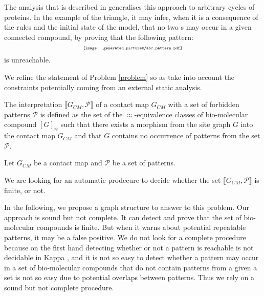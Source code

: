 \documentclass{entcs}
\newcommand{\graphsymb}{G}
\newcommand{\iso}{\approx}
\begin{document}
The analysis that is described in \cite{afp} generalises this approach to arbitrary cycles of proteins. In the example of the triangle, it may infer, when it is a consequence of the rules and the initial state of the model, that no two s may occur in a given connected compound, by proving that the following pattern:
\begin{equation*}
\scalebox{0.6}{\texttt{[image: generated\_pictures/abc\_pattern.pdf]}}
\end{equation*}
is unreachable.

We refine the statement of Problem \ref{problem} so as take into account the constraints potentially coming from an external static analysis.


\begin{defn}
The interpretation $\llbracket \graphsymb_{\textit{CM}}, \mathcal{P}\rrbracket$ of a contact map $\graphsymb_{\textit{CM}}$ with a set of forbidden patterns $\mathcal{P}$ is defined as the set of the $\iso$-equivalence classes of bio-molecular compound $[G]_{\iso}$ such that there exists a morphism from the site graph $G$ into the contact map $\graphsymb_{\textit{CM}}$ and that $G$ contains no occurrence of patterns from the set $\mathcal{P}$.
\end{defn}
\begin{problem}\label{problembis}
Let $\graphsymb_{\textit{CM}}$ be a contact map and $\mathcal{P}$ be a set of patterns.

We are looking for an automatic prodecure to decide whether
the set $\llbracket \graphsymb_{\textit{CM}},\mathcal{P} \rrbracket$ is finite, or not.
\end{problem}

In the following, we propose a graph structure to answer to this problem.
Our approach is sound but not complete. It can detect and prove that the set of bio-molecular compounds is finite. But when it warns about potential repeatable patterns, it may be a false positive. We do not look for a complete procedure because on the first hand detecting whether or not a pattern is reachable is not decidable in Kappa \cite{kreyBig}, and it is not so easy to detect whether a pattern may occur in a set of bio-molecular compounds that do not contain patterns from a given a set is not so easy due to potential overlaps between patterns. Thus we rely on a sound but not complete procedure.
\end{document}
